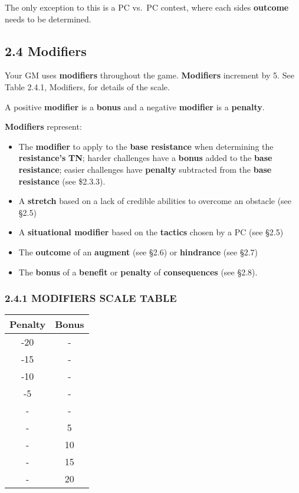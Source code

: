 \documentclass[
  11pt,
]{article}
\providecommand{\tightlist}{%
  \setlength{\itemsep}{0pt}\setlength{\parskip}{0pt}}
\begin{document}
The only exception to this is a PC vs.~PC contest, where each sides
\textbf{outcome} needs to be determined.

\hypertarget{modifiers}{%
\subsection{2.4 Modifiers}\label{modifiers}}

Your GM uses \textbf{modifiers} throughout the game. \textbf{Modifiers}
increment by 5. See Table 2.4.1, Modifiers, for details of the scale.

A positive \textbf{modifier} is a \textbf{bonus} and a negative
\textbf{modifier} is a \textbf{penalty}.

\textbf{Modifiers} represent:

\begin{itemize}
\tightlist
\item
  The \textbf{modifier} to apply to the \textbf{base resistance} when
  determining the \textbf{resistance's} \textbf{TN}; harder challenges
  have a \textbf{bonus} added to the \textbf{base resistance}; easier
  challenges have \textbf{penalty} subtracted from the \textbf{base
  resistance} (see \$2.3.3).
\item
  A \textbf{stretch} based on a lack of credible abilities to overcome
  an obstacle (see §2.5)
\item
  A \textbf{situational modifier} based on the \textbf{tactics} chosen
  by a PC (see §2.5)
\item
  The \textbf{outcome} of an \textbf{augment} (see §2.6) or
  \textbf{hindrance} (see §2.7)
\item
  The \textbf{bonus} of a \textbf{benefit} or \textbf{penalty} of
  \textbf{consequences} (see §2.8).
\end{itemize}

\hypertarget{modifiers-scale-table}{%
\subsubsection{2.4.1 MODIFIERS SCALE
TABLE}\label{modifiers-scale-table}}

\begin{longtable}[]{@{}cc@{}}
\toprule
Penalty & Bonus \\
\midrule
\endhead
-20 & - \\
-15 & - \\
-10 & - \\
-5 & - \\
- & - \\
- & 5 \\
- & 10 \\
- & 15 \\
- & 20 \\
\bottomrule
\end{longtable}
\end{document}
